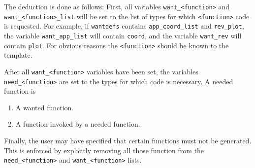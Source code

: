 The deduction is done as follows:
First, all variables \verb!want_<function>! and \verb!want_<function>_list!
will be set to the list of types for which \verb!<function>! code
is requested.
For example, if \texttt{wantdefs} contains \verb!app_coord_list! and
\verb!rev_plot!, the variable \verb!want_app_list! will contain
\texttt{coord}, and the variable \verb!want_rev! will contain \verb!plot!.
For obvious reasons the \verb!<function>! should be known to the template.
\par
After all \verb!want_<function>! variables have been set, the variables
\verb!need_<function>! are set to the types for which code is necessary.
A needed function is
\begin{enumerate}
\item A wanted function.
\item A function invoked by a needed function.
\end{enumerate}
\par
Finally, the user may have specified that certain functions must not be
generated.
This is enforced by explicitly removing all those function from the
\verb!need_<function>! and \verb!want_<function>! lists. 
